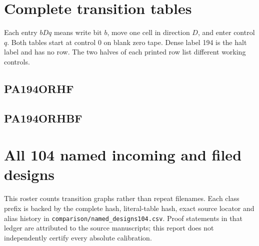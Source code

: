 \documentclass[11pt]{article}
\begin{document}
\appendix
\section{Complete transition tables}\label{app:tables}
Each entry $bDq$ means write bit $b$, move one cell in direction $D$, and enter control $q$. Both tables start at control 0 on blank zero tape. Dense label 194 is the halt label and has no row. The two halves of each printed row list different working controls.
\subsection{PA194ORHF}
\begingroup\small\endgroup
\clearpage
\subsection{PA194ORHBF}
\begingroup\small\endgroup
\section{All 104 named incoming and filed designs}\label{app:roster}
This roster counts transition graphs rather than repeat filenames. Each class prefix is backed by the complete hash, literal-table hash, exact source locator and alias history in \texttt{comparison/named\_designs104.csv}. Proof statements in that ledger are attributed to the source manuscripts; this report does not independently certify every absolute calibration.

\end{document}
